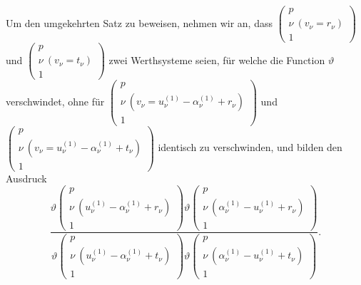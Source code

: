 \documentclass[12pt,a4paper]{book}
\theoremstyle{definition}
\theoremstyle{remark}
\begin{document}
Um den umgekehrten Satz zu beweisen, nehmen wir an, dass $\left(\begin{array}{c} p\\ \nu\ (v_\nu = r_\nu)\\ 1 \end{array}\right)$ und $\left(\begin{array}{c} p\\ \nu\ (v_\nu = t_\nu)\\ 1 \end{array}\right)$ zwei Werthsysteme seien, für welche die Function $\vartheta$ verschwindet, ohne für $\left(\begin{array}{c} p\\ \nu\ (v_\nu = u_\nu^{(1)} - \alpha_\nu^{(1)} + r_\nu)\\ 1 \end{array}\right)$ und $\left(\begin{array}{c} p\\ \nu\ (v_\nu = u_\nu^{(1)} - \alpha_\nu^{(1)} + t_\nu)\\ 1 \end{array}\right)$ identisch zu verschwinden, und bilden den Ausdruck
\begin{equation}
\tag{2}
\frac{\vartheta\left(\begin{array}{c} p\\ \nu\ (u_\nu^{(1)} - \alpha_\nu^{(1)} + r_\nu)\\ 1 \end{array}\right) \vartheta\left(\begin{array}{c} p\\ \nu\ (\alpha_\nu^{(1)} - u_\nu^{(1)} + r_\nu)\\ 1 \end{array}\right)}{\vartheta\left(\begin{array}{c} p\\ \nu\ (u_\nu^{(1)} - \alpha_\nu^{(1)} + t_\nu)\\ 1 \end{array}\right) \vartheta\left(\begin{array}{c} p\\ \nu\ (\alpha_\nu^{(1)} - u_\nu^{(1)} + t_\nu)\\ 1 \end{array}\right)}. \end{equation}
\end{document}
